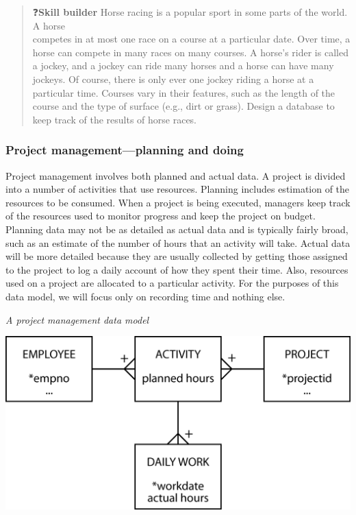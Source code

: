 \documentclass[
]{article}
\begin{document}
\begin{quote}
❓\textbf{Skill builder} Horse racing is a popular sport in some parts of
the world. A horse\\
competes in at most one race on a course at a particular date. Over
time, a horse can compete in many races on many courses. A horse's
rider is called a jockey, and a jockey can ride many horses and a
horse can have many jockeys. Of course, there is only ever one jockey
riding a horse at a particular time. Courses vary in their features,
such as the length of the course and the type of surface (e.g., dirt
or grass). Design a database to keep track of the results of horse
races.
\end{quote}

\hypertarget{project-managementplanning-and-doing}{%
\subsubsection*{Project management---planning and doing}\label{project-managementplanning-and-doing}}

Project management involves both planned and actual data. A project is
divided into a number of activities that use resources. Planning
includes estimation of the resources to be consumed. When a project is
being executed, managers keep track of the resources used to monitor
progress and keep the project on budget. Planning data may not be as
detailed as actual data and is typically fairly broad, such as an
estimate of the number of hours that an activity will take. Actual data
will be more detailed because they are usually collected by getting
those assigned to the project to log a daily account of how they spent
their time. Also, resources used on a project are allocated to a
particular activity. For the purposes of this data model, we will focus
only on recording time and nothing else.

\emph{A project management data model}

\includegraphics{Figures/Chapter 7/planning.png}
\end{document}
